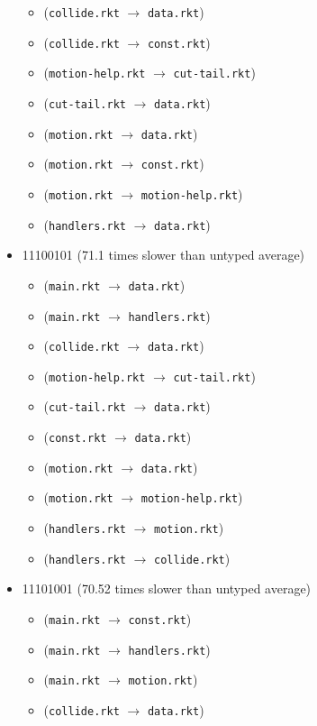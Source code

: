 \documentclass{article}
\newcommand{\mono}[1]{\texttt{#1}}
\begin{document}
\begin{itemize}
\begin{itemize}
  \item (\mono{collide.rkt} $\rightarrow$ \mono{data.rkt})
  \item (\mono{collide.rkt} $\rightarrow$ \mono{const.rkt})
  \item (\mono{motion-help.rkt} $\rightarrow$ \mono{cut-tail.rkt})
  \item (\mono{cut-tail.rkt} $\rightarrow$ \mono{data.rkt})
  \item (\mono{motion.rkt} $\rightarrow$ \mono{data.rkt})
  \item (\mono{motion.rkt} $\rightarrow$ \mono{const.rkt})
  \item (\mono{motion.rkt} $\rightarrow$ \mono{motion-help.rkt})
  \item (\mono{handlers.rkt} $\rightarrow$ \mono{data.rkt})
  \end{itemize}
\item 11100101 (71.1 times slower than untyped average)
  \begin{itemize}
  \item (\mono{main.rkt} $\rightarrow$ \mono{data.rkt})
  \item (\mono{main.rkt} $\rightarrow$ \mono{handlers.rkt})
  \item (\mono{collide.rkt} $\rightarrow$ \mono{data.rkt})
  \item (\mono{motion-help.rkt} $\rightarrow$ \mono{cut-tail.rkt})
  \item (\mono{cut-tail.rkt} $\rightarrow$ \mono{data.rkt})
  \item (\mono{const.rkt} $\rightarrow$ \mono{data.rkt})
  \item (\mono{motion.rkt} $\rightarrow$ \mono{data.rkt})
  \item (\mono{motion.rkt} $\rightarrow$ \mono{motion-help.rkt})
  \item (\mono{handlers.rkt} $\rightarrow$ \mono{motion.rkt})
  \item (\mono{handlers.rkt} $\rightarrow$ \mono{collide.rkt})
  \end{itemize}
\item 11101001 (70.52 times slower than untyped average)
  \begin{itemize}
  \item (\mono{main.rkt} $\rightarrow$ \mono{const.rkt})
  \item (\mono{main.rkt} $\rightarrow$ \mono{handlers.rkt})
  \item (\mono{main.rkt} $\rightarrow$ \mono{motion.rkt})
  \item (\mono{collide.rkt} $\rightarrow$ \mono{data.rkt})

\end{itemize}
\end{itemize}
\end{document}

